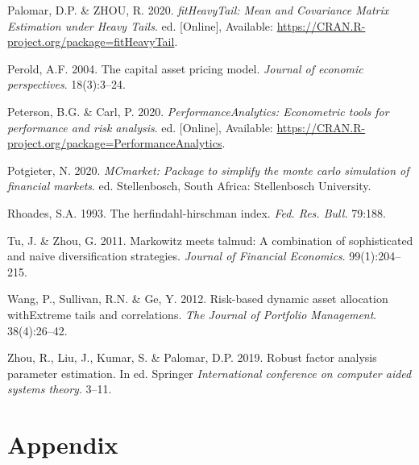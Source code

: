 \documentclass[11pt,preprint, authoryear]{elsarticle}
\numberwithin{equation}{section}
\numberwithin{figure}{section}
\numberwithin{table}{section}
\begin{document}
\leavevmode\hypertarget{ref-fitHeavyTail}{}%
Palomar, D.P. \& ZHOU, R. 2020. \emph{fitHeavyTail: Mean and Covariance
Matrix Estimation under Heavy Tails}. ed. {[}Online{]}, Available:
\url{https://CRAN.R-project.org/package=fitHeavyTail}.

\leavevmode\hypertarget{ref-perold2004}{}%
Perold, A.F. 2004. The capital asset pricing model. \emph{Journal of
economic perspectives}. 18(3):3--24.

\leavevmode\hypertarget{ref-PerformanceAnalytics}{}%
Peterson, B.G. \& Carl, P. 2020. \emph{PerformanceAnalytics: Econometric
tools for performance and risk analysis}. ed. {[}Online{]}, Available:
\url{https://CRAN.R-project.org/package=PerformanceAnalytics}.

\leavevmode\hypertarget{ref-MCmarket}{}%
Potgieter, N. 2020. \emph{MCmarket: Package to simplify the monte carlo
simulation of financial markets}. ed. Stellenbosch, South Africa:
Stellenbosch University.

\leavevmode\hypertarget{ref-rhoades1993}{}%
Rhoades, S.A. 1993. The herfindahl-hirschman index. \emph{Fed. Res.
Bull.} 79:188.

\leavevmode\hypertarget{ref-tu2011}{}%
Tu, J. \& Zhou, G. 2011. Markowitz meets talmud: A combination of
sophisticated and naive diversification strategies. \emph{Journal of
Financial Economics}. 99(1):204--215.

\leavevmode\hypertarget{ref-wang2012}{}%
Wang, P., Sullivan, R.N. \& Ge, Y. 2012. Risk-based dynamic asset
allocation withExtreme tails and correlations. \emph{The Journal of
Portfolio Management}. 38(4):26--42.

\leavevmode\hypertarget{ref-zhou2019}{}%
Zhou, R., Liu, J., Kumar, S. \& Palomar, D.P. 2019. Robust factor
analysis parameter estimation. In ed. Springer \emph{International
conference on computer aided systems theory}. 3--11.

\newpage

\hypertarget{appendix}{%
\section*{Appendix}\label{appendix}}
\end{document}
